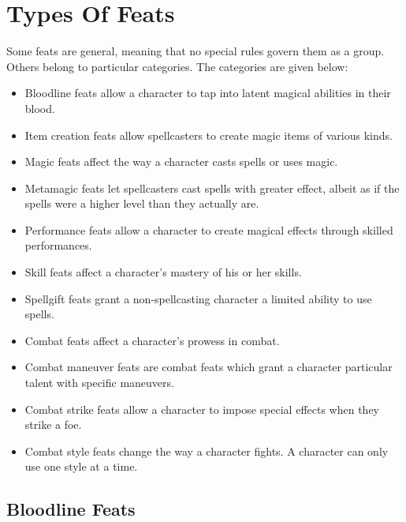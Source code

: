 \section{Types Of Feats}
Some feats are general, meaning that no special rules govern
them as a group.
Others belong to particular categories.
The categories are given below:
\begin{itemize}
    \item Bloodline feats allow a character to tap into latent magical abilities in their blood.
    \item Item creation feats allow spellcasters to create magic items of various kinds.
    \item Magic feats affect the way a character casts spells or uses magic.
    \item Metamagic feats let spellcasters cast spells with greater effect, albeit as if the spells were a higher level than they actually are.
    \item Performance feats allow a character to create magical effects through skilled performances.
    \item Skill feats affect a character's mastery of his or her skills.
    \item Spellgift feats grant a non-spellcasting character a limited ability to use spells.
    \item Combat feats affect a character's prowess in combat.
    \item Combat maneuver feats are combat feats which grant a character particular talent with specific maneuvers.
    \item Combat strike feats allow a character to impose special effects when they strike a foe.
    \item Combat style feats change the way a character fights.
        A character can only use one style at a time.
\end{itemize}

\subsection{Bloodline Feats}

